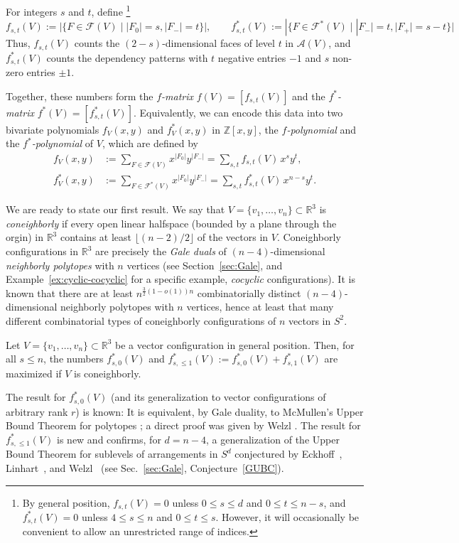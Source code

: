\documentclass[a4paper,USenglish,cleveref, autoref, thm-restate,nolineno]{socg-lipics-v2021}
\newcommand{\arr}{\mathcal{A}}
\renewcommand{\leq}{\leqslant}
\newcommand{\R}{\mathbb{R}}
\newcommand{\Z}{\mathbb{Z}}
\begin{document}
\begin{definition}[$f$ and $f^*$]
\label{def:f-poly}
For integers $s$ and $t$, define%
\footnote{By general position, $f_{s,t}(V)=0$ unless $0\leq s\leq d$ and $0\leq t\leq n-s$, and 
$f^*_{s,t}(V)=0$ unless $4\leq s \leq n$ and $0\leq t\leq s$. However, it will occasionally be convenient to allow an unrestricted range of indices.}
$$
f_{s,t}(V):=|\{F\in \mathcal{F}(V)\mid |F_0|=s,|F_-|=t\}|, \qquad f^*_{s,t}(V):=|\{F\in \mathcal{F}^*(V)\mid |F_-|=t, |F_+|=s-t\}|
$$
Thus, $f_{s,t}(V)$ counts the $(2-s)$-dimensional faces of level $t$ in $\arr(V)$, and $f^*_{s,t}(V)$ counts the dependency patterns with $t$ negative entries $-1$ and $s$ non-zero entries $\pm 1$.

Together, these numbers form the \emph{$f$-matrix} $f(V)=[f_{s,t}(V)]$ and the \emph{$f^*$-matrix} $f^*(V)=[f^*_{s,t}(V)]$. Equivalently, we can encode this data into two bivariate polynomials
$f_V(x,y)$ and $f^*_V(x,y)$ in $\Z[x,y]$, the \emph{$f$-polynomial} and the \emph{$f^*$-polynomial} of $V$, which are defined by 
\begin{align*} 
f_{V}(x,y) & :=  \sum_{F\in \mathcal{F}(V)} x^{|F_0|} y^{|F_-|} = \sum_{s,t} f_{s,t}(V)\, x^s y^t,\\
f^*_{V}(x,y) &:= \sum_{F\in \mathcal{F}^*(V)} x^{|F_0|} y^{|F_-|} = \sum_{s,t} f^*_{s,t}(V)\, x^{n-s} y^t.
\end{align*}
\end{definition}
We are ready to state our first result. We say that $V = \{ v_1, \ldots, v_n \} \subset \R^3$ is \emph{coneighborly} if every open linear halfspace (bounded by a plane through the orgin) in $\R^3$ contains at least $\lfloor (n-2)/2 \rfloor$ of the vectors in $V$. Coneighborly configurations in $\R^3$ are precisely the \emph{Gale duals} of $(n-4)$-dimensional \emph{neighborly polytopes} with $n$ vertices (see Section~\ref{sec:Gale}, and Example~\ref{ex:cyclic-cocyclic} for a specific example, \emph{cocyclic} configurations). It is known \cite{Padrol:2013aa} that there are at least $n^{\frac{3}{2}(1-o(1))n}$ combinatorially distinct $(n-4)$-dimensional neighborly polytopes with $n$ vertices, hence at least that many different combinatorial types of 
coneighborly configurations of $n$ vectors in $S^2$. 
\begin{theorem} 
\label{thm:GUBT-fstar}
Let $V = \{ v_1, \ldots, v_n \} \subset \R^3$ be a vector configuration in general position. Then, for all $s\leq n$, the numbers $f^*_{s,0}(V)$ and $f^*_{s,\leq 1}(V):=f^*_{s,0}(V)+f^*_{s,1}(V)$ are maximized if $V$ is coneighborly.
\end{theorem}
The result for $f^*_{s,0}(V)$ (and its generalization to vector configurations of arbitrary rank $r$) is known: It is equivalent, by Gale duality, to McMullen's Upper Bound Theorem for polytopes \cite{McMullen:1970aa}; a direct proof was given by Welzl \cite{Welzl:2001aa}. The result for $f^*_{s,\leq 1}(V)$ is new and confirms, for $d=n-4$, a generalization of the Upper Bound Theorem for sublevels of arrangements in $S^d$ conjectured by Eckhoff~\cite{Eckhoff:1993aa}, Linhart~\cite{Linhart:1994aa}, and Welzl~\cite{Welzl:2001aa} (see Sec.~\ref{sec:Gale}, Conjecture~\ref{GUBC}). 
\end{document}
